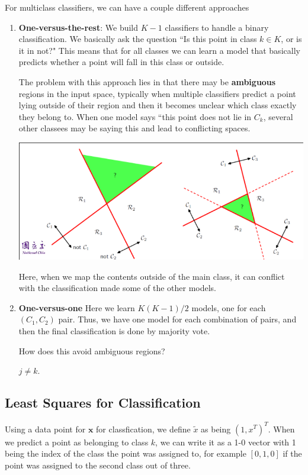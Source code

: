 \documentclass{tufte-handout}
\renewcommand{\vec}[1]{\mathbf{#1}}
\begin{document}
For multiclass classifiers, we can have a couple different approaches
\begin{enumerate}
	\item \textbf{One-versus-the-rest}: We build $K-1$ classifiers to handle a binary classification. We
			basically ask the question ``Is this point in class $k\in K$, or is it in not?" This means that
			for all classes we can learn a model that basically predicts whether a point will fall in this 
			class or outside. 

			The problem with this approach lies in that there may be \textbf{ambiguous} regions in the input
			space, typically when multiple classifiers predict a point lying outside of their region and then
			it becomes unclear which class exactly they belong to. When one model says ``this point does not lie
			in $C_{k}$, several other classees may be saying this and lead to conflicting spaces.
			\begin{marginfigure}
				\includegraphics[scale=0.2]{ambiguous}
				\caption{Here, when we map the contents outside of the main class, it can conflict with the
						classification made some of the other models.}
			\end{marginfigure}

	\item \textbf{One-versus-one}
			Here we learn $K(K-1)/2$ models, one for each $(C_{1}, C_{2})$ pair. 
			Thus, we have one model for each combination of pairs, and then the final classification is done
			by majority vote.
			
			How does this avoid ambiguous regions? 

			$j \neq k$.
\end{enumerate}
\subsection{Least Squares for Classification}
	Using  a data point for $\vec{x}$ for classfication, we define $\tilde{x}$ as being $(1, x^{T})^{T}$.
	When we predict a point as belonging to class $k$, we can write it as a 1-0 vector with 1 being the 
	index of the class the point was assigned to, for example $[0,1,0]$ if the point was assigned to 
	the second class out of three.
	
\end{document}

